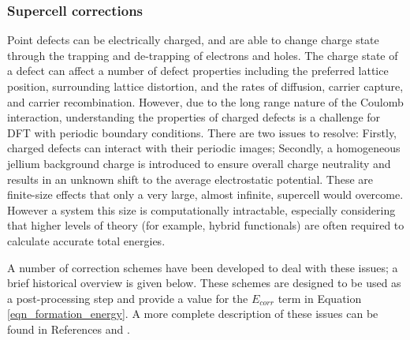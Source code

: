 
\subsubsection{Supercell corrections} \label{corrections}
Point defects can be electrically charged, and are able to change charge state through the trapping and de-trapping of electrons and holes. 
The charge state of a defect can affect a number of defect properties including the preferred lattice position, surrounding lattice distortion, and the rates of diffusion, carrier capture, and carrier recombination.
However, due to the long range nature of the Coulomb interaction, understanding the properties of charged defects is a challenge for DFT with periodic boundary conditions.
There are two issues to resolve: 
Firstly, charged defects can interact with their periodic images; 
Secondly, a homogeneous jellium background charge is introduced to ensure overall charge neutrality and results in an unknown shift to the average electrostatic potential. 
These are finite-size effects that only a very large, almost infinite, supercell would overcome.
However a system this size is computationally intractable, especially considering that higher levels of theory (for example, hybrid functionals) are often required to calculate accurate total energies.

A number of correction schemes have been developed to deal with these issues; a brief historical overview is given below. These schemes are designed to be used as a post-processing step and provide a value for the $E_{corr}$ term in Equation \ref{eqn_formation_energy}. A more complete description of these issues can be found in References \cite{durrant2018} and \cite{Vinichenko2017}.

